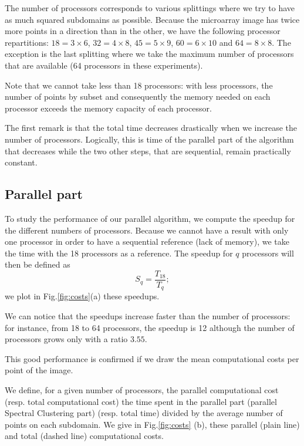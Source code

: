 \documentclass[runningheads,a4paper]{llncs}
\begin{document}
The number of processors corresponds to various splittings where we try to
have as much squared subdomains as possible. Because the microarray image has
twice more points in a direction than in the other, we have the following
processor repartitions: $18 = 3\times6$, $32 = 4\times8$, $45 = 5\times9$,
$60 = 6\times10$ and $64 = 8 \times 8$. The exception is the last splitting
where we take the maximum number of processors that are available (64
processors in these experiments).

Note that we cannot take less than 18 processors: with less processors, the
number of points by subset and consequently the memory needed on each processor
exceeds the memory capacity of each processor.

The first remark is that the total time decreases drastically when we increase
the number of processors. Logically, this is time of the parallel part of the
algorithm that decreases while the two other steps, that are sequential,
remain practically constant.

\subsection{Parallel part}
To study the performance of our parallel algorithm, we compute the speedup for
the different numbers of processors. Because we cannot have a result with only
one processor in order to have a sequential reference (lack of memory), we
take the time with the 18 processors as a reference. The speedup for $q$
processors will then be defined as $$S_q = \frac{T_{18}}{ T_q};$$we plot in
Fig.\ref{fig:costs}(a) these speedups.


We can notice that the speedups increase faster than the number of processors:
for instance, from 18 to 64 processors, the speedup is 12 although the number
of processors grows only with a ratio $3.55$.

This good performance is confirmed if we draw the mean computational costs per
point of the image.

We define, for a given number of processors, the parallel computational cost
(resp. total computational cost) the time spent in the parallel part (parallel
Spectral Clustering part) (resp. total time) divided by the average number of
points on each subdomain. We give in Fig.\ref{fig:costs} (b), these parallel
(plain line) and total (dashed line) computational costs.
\end{document}
